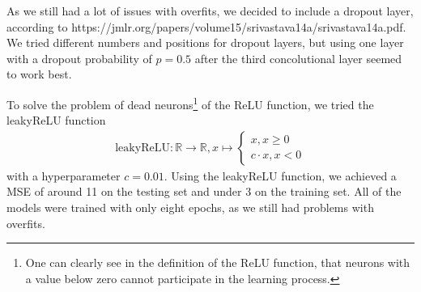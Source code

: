 \documentclass[conference]{IEEEtran}
\begin{document}
As we still had a lot of issues with overfits, we decided to include a dropout layer, according to https://jmlr.org/papers/volume15/srivastava14a/srivastava14a.pdf. We tried different numbers and positions for dropout layers, but using one layer with a dropout 
probability of $p=0.5$ after the third concolutional layer seemed to work best.

To solve the problem of dead neurons\footnote{One can clearly see in the definition of the ReLU 
function, that neurons with a value below zero cannot participate in the learning process.} of the ReLU function, we 
tried the leakyReLU function
\begin{align*}
\mathrm{leakyReLU} : \mathbb{R} \to \mathbb{R}, x \mapsto \begin{cases}
x, x \geq 0\\
c \cdot x, x <0
\end{cases}
\end{align*}
with a hyperparameter $c = 0.01$. Using the leakyReLU function, we achieved a MSE of around 11 on the testing set and under 3 on the 
training set. All of the models were trained with only eight epochs, as we still had problems with overfits.
\end{document}

